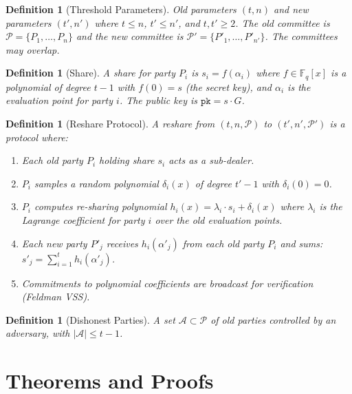 \documentclass[11pt]{article}
\newtheorem{definition}[theorem]{Definition}
\begin{document}
\begin{definition}[Threshold Parameters]
Old parameters $(t, n)$ and new parameters $(t', n')$ where $t \leq n$, $t' \leq n'$, and $t, t' \geq 2$. The old committee is $\mathcal{P} = \{P_1, \ldots, P_n\}$ and the new committee is $\mathcal{P}' = \{P'_1, \ldots, P'_{n'}\}$. The committees may overlap.
\end{definition}

\begin{definition}[Share]
A share for party $P_i$ is $s_i = f(\alpha_i)$ where $f \in \mathbb{F}_q[x]$ is a polynomial of degree $t-1$ with $f(0) = s$ (the secret key), and $\alpha_i$ is the evaluation point for party $i$. The public key is $\texttt{pk} = s \cdot G$.
\end{definition}

\begin{definition}[Reshare Protocol]
A reshare from $(t, n, \mathcal{P})$ to $(t', n', \mathcal{P}')$ is a protocol where:
\begin{enumerate}
  \item Each old party $P_i$ holding share $s_i$ acts as a sub-dealer.
  \item $P_i$ samples a random polynomial $\delta_i(x)$ of degree $t'-1$ with $\delta_i(0) = 0$.
  \item $P_i$ computes re-sharing polynomial $h_i(x) = \lambda_i \cdot s_i + \delta_i(x)$ where $\lambda_i$ is the Lagrange coefficient for party $i$ over the old evaluation points.
  \item Each new party $P'_j$ receives $h_i(\alpha'_j)$ from each old party $P_i$ and sums: $s'_j = \sum_{i=1}^{t} h_i(\alpha'_j)$.
  \item Commitments to polynomial coefficients are broadcast for verification (Feldman VSS).
\end{enumerate}
\end{definition}

\begin{definition}[Dishonest Parties]
A set $\mathcal{A} \subset \mathcal{P}$ of old parties controlled by an adversary, with $|\mathcal{A}| \leq t - 1$.
\end{definition}


\section{Theorems and Proofs}
\end{document}

